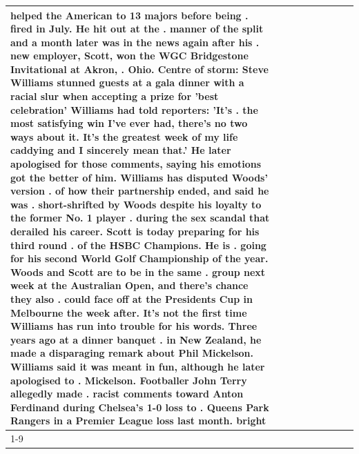 \begin{table}[H]
\begin{tabular}{lllrlllll}
helped the American to 13 majors before being . fired in July. He hit out at the . manner of the split and a month later was in the news again after his . new employer, Scott, won the WGC Bridgestone Invitational at Akron, . Ohio. Centre of storm: Steve Williams stunned guests at a gala dinner with a racial slur when accepting a prize for 'best celebration' Williams had told reporters: 'It's . the most satisfying win I've ever had, there's no two ways about it. It's the greatest week of my life caddying and I sincerely mean that.' He later apologised for those comments, saying his emotions got the better of him. Williams has disputed Woods' version . of how their partnership ended, and said he was . short-shrifted by Woods despite his loyalty to the former No. 1 player . during the sex scandal that derailed his career. Scott is today preparing for his third round . of the HSBC Champions. He is . going for his second World Golf Championship of the year. Woods and Scott are to be in the same . group next week at the Australian Open, and there's chance they also . could face off at the Presidents Cup in Melbourne the week after. It's not the first time Williams has run into trouble for his words. Three years ago at a dinner banquet . in New Zealand, he made a disparaging remark about Phil Mickelson. Williams said it was meant in fun, although he later apologised to . Mickelson. Footballer John Terry allegedly made . racist comments toward Anton Ferdinand during Chelsea's 1-0 loss to . Queens Park Rangers in a Premier League loss last month. bright \\
\cline{1-9}

\end{tabular}
\end{table}
